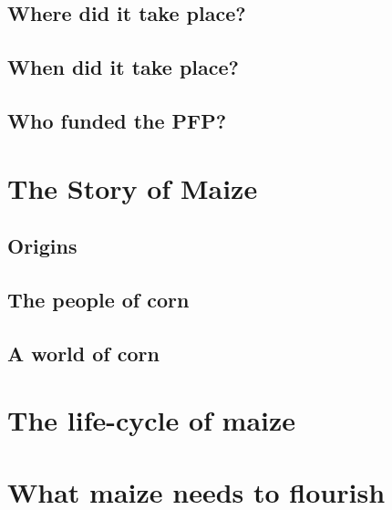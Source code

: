 \documentclass[12pt,]{krantz}
\theoremstyle{definition}
\theoremstyle{definition}
\theoremstyle{definition}
\theoremstyle{remark}
\begin{document}
\hypertarget{where-did-it-take-place}{%
\section{Where did it take place?}\label{where-did-it-take-place}}

\hypertarget{when-did-it-take-place}{%
\section{When did it take place?}\label{when-did-it-take-place}}

\hypertarget{who-funded-the-pfp}{%
\section{Who funded the PFP?}\label{who-funded-the-pfp}}

\hypertarget{the-story-of-maize}{%
\chapter{The Story of Maize}\label{the-story-of-maize}}

\hypertarget{origins}{%
\section{Origins}\label{origins}}

\hypertarget{the-people-of-corn}{%
\section{The people of corn}\label{the-people-of-corn}}

\hypertarget{a-world-of-corn}{%
\section{A world of corn}\label{a-world-of-corn}}

\hypertarget{the-life-cycle-of-maize}{%
\chapter{The life-cycle of maize}\label{the-life-cycle-of-maize}}

\hypertarget{what-maize-needs-to-flourish}{%
\chapter{What maize needs to
flourish}\label{what-maize-needs-to-flourish}}
\end{document}
